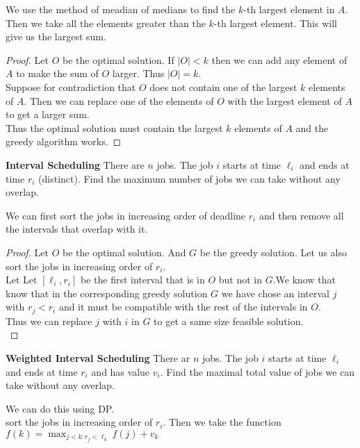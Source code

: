 \documentclass[answers,12pt,addpoints]{exam}
\begin{document}
\begin{questions}
\begin{solution}
    We use the method of meadian of medians to find the $k$-th largest element in $A$. Then we take all the elements greater than the $k$-th largest element. This will give us the largest sum.
    \begin{proof}
        Let $O$ be the optimal solution. If $|O| < k$ then we can add any element of $A$ to make the sum of $O$ larger. Thus $|O| = k$.\\
        Suppose for contradiction that $O$ does not contain one of the largest $k$ elements of $A$. Then we can replace one of the elements of $O$ with the largest element of $A$ to get a larger sum.\\
        Thus the optimal solution must contain the largest $k$ elements of $A$ and the greedy algorithm works.
    \end{proof}
\end{solution}
\question\textbf{Interval Scheduling}
There are $n$ jobs. The job $i$ starts at time $\ell_i$ and ends at time $r_i$ (distinct). Find the maximum number of jobs we can take without any overlap. 
\begin{solution}
    We can first sort the jobs in increasing order of deadline $r_i$ and then remove all the intervals that overlap with it. 
    \begin{proof}
        Let $O$ be the optimal solution. And $G$ be the greedy solution. Let us also sort the jobs in increasing order of $r_i$.\\
        Let Let $[\ell_i,r_i]$ be the first interval that is in $O$ but not in $G$.We know that know that in the corresponding greedy solution $G$  we have chose an interval $j$ with $r_j < r_i$ and it must be compatible with the rest of the intervals in $O$.\\
        Thus we can replace $j$ with $i$ in $G$ to get a same size feasible solution.\\
    \end{proof}
\end{solution}
\question\textbf{Weighted Interval Scheduling}
There ar $n$ jobs. The job $i$ starts at time $\ell_i$ and ends at time $r_i$ and has value $v_i$. Find the maximal total value of jobs we can take without any overlap.
\begin{solution}
    We can do this using DP. \\
    sort the jobs in increasing order of $r_i$. Then we take the function $f(k) = \max_{j < k: r_j < \ell_k} {f(j)} + v_k$\\

\end{solution}
\end{questions}
\end{document}
